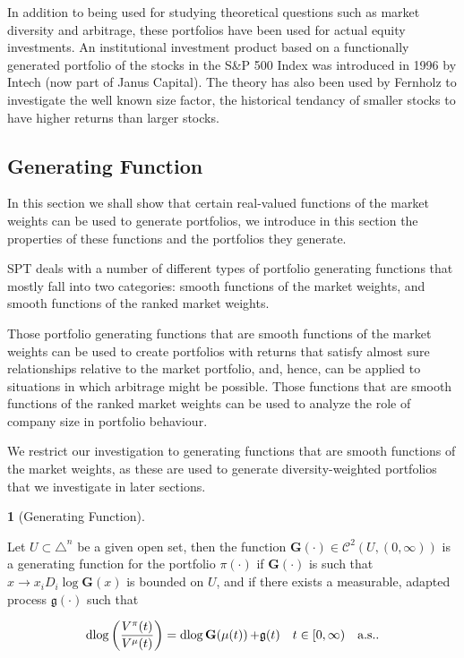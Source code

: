 \documentclass[british]{amsart} \usepackage{lmodern}
\numberwithin{equation}{section} \numberwithin{figure}{section}
\theoremstyle{plain} \newtheorem{thm}{\protect\theoremname}[section]
\theoremstyle{definition} \newtheorem{defn}[thm]{\protect\definitionname}
\theoremstyle{plain} \newtheorem{assumption}[thm]{\protect\assumptionname}
\theoremstyle{plain} \newtheorem{lem}[thm]{\protect\lemmaname}
\theoremstyle{plain} \newtheorem{prop}[thm]{\protect\propositionname}
\theoremstyle{remark} \newtheorem{rem}[thm]{\protect\remarkname}
\theoremstyle{plain} \newtheorem{cor}[thm]{\protect\corollaryname}
\renewcommand{\d}[1]{\mathop{\mathrm{d}{#1}}}
\begin{document}
In addition to being used for studying theoretical questions such as market
diversity and arbitrage, these portfolios have been used for actual equity
investments. An institutional investment product based on a functionally
generated portfolio of the stocks in the S&P 500 Index was introduced in 1996 by
Intech (now part of Janus Capital). The theory has also been used by Fernholz
\cite{fernholz1999diversity} to investigate the well known size factor, the
historical tendancy of smaller stocks to have higher returns than larger stocks.

\subsection{Generating Function}

In this section we shall show that certain real-valued functions of the market
weights can be used to generate portfolios, we introduce in this section the
properties of these functions and the portfolios they generate. 

SPT deals with a number of different types of portfolio generating functions
that mostly fall into two categories: smooth functions of the market weights, 
and smooth functions of the ranked market weights. 

Those portfolio generating functions that are smooth functions of the market
weights can be used to create portfolios with returns that satisfy almost sure
relationships relative to the market portfolio, and, hence, can be applied to
situations in which arbitrage might be possible. Those functions that are smooth
functions of the ranked market weights can be used to analyze the role of
company size in portfolio behaviour.

We restrict our investigation to generating functions that are smooth functions
of the market weights, as these are used to generate diversity-weighted
portfolios that we investigate in later sections.

\newcommand{\G}[1]{\mathbf{G}(#1)}
\newcommand{\Gmu}{\G{\mu(t)}}
\newcommand{\g}{\mathfrak{g}(t)}

\begin{defn} [Generating Function] 
  \label{def:generatingfunction}

  Let $U \subset \triangle^{n}$ be a given open set, then the function
  $\G{\cdot} \in \mathcal{C}^{2}(U,(0,\infty))$ is a generating function for the
  portfolio $\pi(\cdot)$ if $\G{\cdot}$ is such that $x\to
  x_{i}D_{i}\log\G{x}$ is bounded on $U$, and if there exists a
  measurable, adapted process $\mathfrak{g}(\cdot)$ such that 

  \begin{equation}
    \d{ \log \left( \frac{V^{\pi}(t)}{V^{\mu}(t)} \right) } = 
    \d{\log{\Gmu}} + \g 
    \quad \ranget
    \quad \almostsurely.
  \end{equation}

\end{defn}
\end{document}
